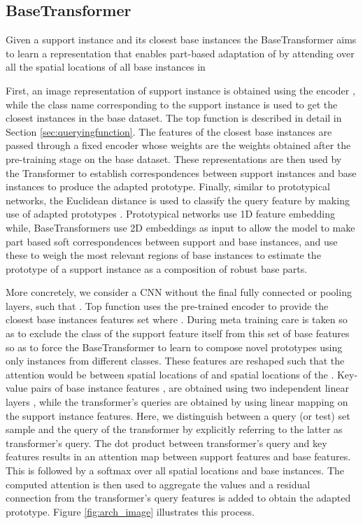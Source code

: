 \documentclass{bmvc2k}
\begin{document}
\subsection{BaseTransformer} \label{sec:basetransformer}
Given a support instance  and its closest base instances  the BaseTransformer aims to learn a representation that enables part-based adaptation of   by attending over all the spatial locations of all base instances in 

First, an image representation of support instance  is obtained using the encoder , while the class name corresponding to the support instance is used to get the  closest instances in the base dataset. The top  function is described in detail in Section \ref{sec:queryingfunction}. The features of the closest base instances are passed through a fixed encoder  whose weights are the weights obtained after the pre-training stage on the base dataset. These representations are then used by the Transformer to establish correspondences between support instances and base instances to produce the adapted prototype. Finally, similar to prototypical networks, the Euclidean distance is used to classify the query feature  by making use of  adapted prototypes . Prototypical networks use 1D feature embedding while, BaseTransformers use 2D embeddings as input to allow the model to make part based soft correspondences between support and base instances, and use these to weigh the most relevant regions of base instances to estimate the prototype of a support instance as a composition of robust base parts.

More concretely, we consider a CNN without the final fully connected or pooling layers, such that . Top  function uses the pre-trained encoder  to provide the closest base instances features set  where . During meta training care is taken so as to exclude the class of the support feature itself from this set of base features so as to force the BaseTransformer to learn to compose novel prototypes using only instances from different classes. These features are reshaped such that the attention would be between spatial locations of  and spatial locations of the . Key-value pairs of base instance features ,  are obtained using two independent linear layers ,  while the transformer's queries  are obtained by using linear mapping  on the support instance features. Here, we distinguish between a query (or test) set sample and the query of the transformer by explicitly referring to the latter as transformer's query. The dot product between transformer's query and key features results in an attention map between support features and base features. This is followed by a softmax over all spatial locations and  base instances. The computed attention is then used to aggregate the values and a residual connection from the transformer's query features is added to obtain the adapted prototype. Figure \ref{fig:arch_image} illustrates this process.  
\end{document}
